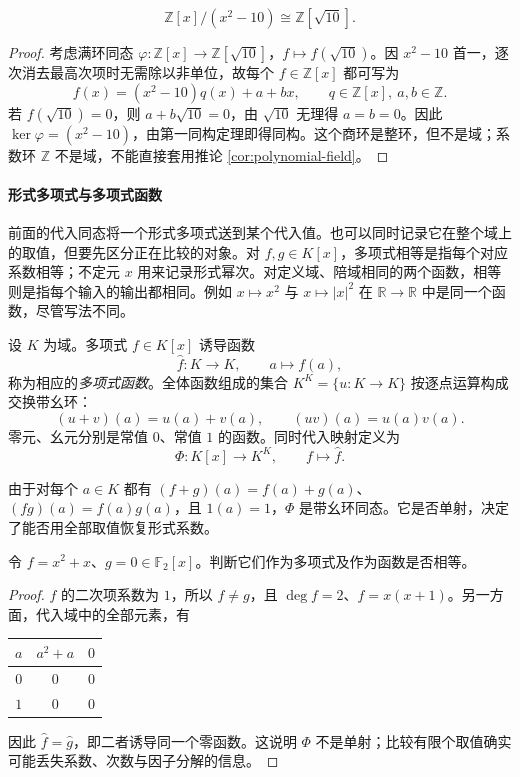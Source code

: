 \documentclass[lang=cn,a4paper,fontset=none,zihao=false,10pt,openany,twoside]{beautybook}
\numberwithin{algorithm}{chapter}
\newcommand{\R}{\mathbb R}
\begin{document}
\begin{example}[通过代入得到商环]
\[
 \mathbb Z[x]/(x^2-10)\cong\mathbb Z[\sqrt{10}].
\]
\end{example}
\begin{proof}
考虑满环同态 $\varphi:\mathbb Z[x]\to\mathbb Z[\sqrt{10}]$，$f\mapsto f(\sqrt{10})$。因 $x^2-10$ 首一，逐次消去最高次项时无需除以非单位，故每个 $f\in\mathbb Z[x]$ 都可写为
\[
 f(x)=(x^2-10)q(x)+a+bx,\qquad q\in\mathbb Z[x],\ a,b\in\mathbb Z.
\]
若 $f(\sqrt{10})=0$，则 $a+b\sqrt{10}=0$，由 $\sqrt{10}$ 无理得 $a=b=0$。因此 $\ker\varphi=(x^2-10)$，由第一同构定理即得同构。这个商环是整环，但不是域；系数环 $\mathbb Z$ 不是域，不能直接套用推论 \ref{cor:polynomial-field}。
\end{proof}

\paragraph{形式多项式与多项式函数}
前面的代入同态将一个形式多项式送到某个代入值。也可以同时记录它在整个域上的取值，但要先区分正在比较的对象。对 $f,g\in K[x]$，多项式相等是指每个对应系数相等；不定元 $x$ 用来记录形式幂次。对定义域、陪域相同的两个函数，相等则是指每个输入的输出都相同。例如 $x\mapsto x^2$ 与 $x\mapsto |x|^2$ 在 $\R\to\R$ 中是同一个函数，尽管写法不同。

\begin{definition}[多项式函数与同时代入映射]
设 $K$ 为域。多项式 $f\in K[x]$ 诱导函数
\[
 \widehat f:K\longrightarrow K,\qquad a\longmapsto f(a),
\]
称为相应的\emph{多项式函数}。全体函数组成的集合 $K^K=\{u:K\to K\}$ 按逐点运算构成交换带幺环：
\[
 (u+v)(a)=u(a)+v(a),\qquad (uv)(a)=u(a)v(a).
\]
零元、幺元分别是常值 $0$、常值 $1$ 的函数。同时代入映射定义为
\[
 \Phi:K[x]\longrightarrow K^K,\qquad f\longmapsto\widehat f.
\]
\end{definition}
由于对每个 $a\in K$ 都有 $(f+g)(a)=f(a)+g(a)$、$(fg)(a)=f(a)g(a)$，且 $1(a)=1$，$\Phi$ 是带幺环同态。它是否单射，决定了能否用全部取值恢复形式系数。

\begin{example}\label{ex:polynomial-function-f2}
令 $f=x^2+x$、$g=0\in\mathbb F_2[x]$。判断它们作为多项式及作为函数是否相等。
\end{example}
\begin{proof}
$f$ 的二次项系数为 $1$，所以 $f\ne g$，且 $\deg f=2$、$f=x(x+1)$。另一方面，代入域中的全部元素，有
\begin{center}
\begin{tabular}{@{}ccc@{}}
\toprule
$a$ & $a^2+a$ & $0$\\
\midrule
$0$ & $0$ & $0$\\
$1$ & $0$ & $0$\\
\bottomrule
\end{tabular}
\end{center}
因此 $\widehat f=\widehat g$，即二者诱导同一个零函数。这说明 $\Phi$ 不是单射；比较有限个取值确实可能丢失系数、次数与因子分解的信息。
\end{proof}
\end{document}
